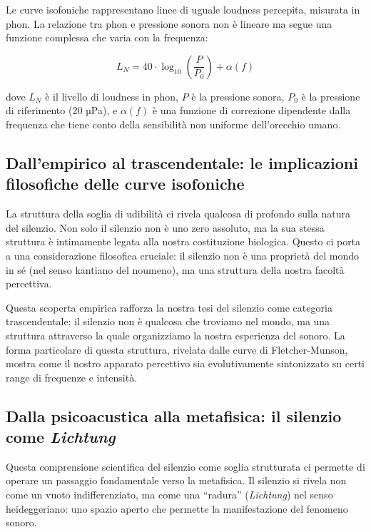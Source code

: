 \documentclass[a4paper,11pt]{article}
\begin{document}
Le curve isofoniche rappresentano linee di uguale loudness percepita,
misurata in phon. La relazione tra phon e pressione sonora non è lineare
ma segue una funzione complessa che varia con la frequenza:

\[L_N = 40 \cdot \log_{10}\left(\frac{P}{P_0}\right) + \alpha(f)\]

dove \(L_N\) è il livello di loudness in phon, \(P\) è la pressione
sonora, \(P_0\) è la pressione di riferimento (20 µPa), e \(\alpha(f)\)
è una funzione di correzione dipendente dalla frequenza che tiene conto
della sensibilità non uniforme dell'orecchio umano.

\subsection{Dall'empirico al trascendentale: le implicazioni filosofiche
delle curve
isofoniche}\label{dallempirico-al-trascendentale-le-implicazioni-filosofiche-delle-curve-isofoniche}

La struttura della soglia di udibilità ci rivela qualcosa di profondo
sulla natura del silenzio. Non solo il silenzio non è uno zero assoluto,
ma la sua stessa struttura è intimamente legata alla nostra costituzione
biologica. Questo ci porta a una considerazione filosofica cruciale: il
silenzio non è una proprietà del mondo in sé (nel senso kantiano del
noumeno), ma una struttura della nostra facoltà percettiva.

Questa scoperta empirica rafforza la nostra tesi del silenzio come
categoria trascendentale: il silenzio non è qualcosa che troviamo nel
mondo, ma una struttura attraverso la quale organizziamo la nostra
esperienza del sonoro. La forma particolare di questa struttura,
rivelata dalle curve di Fletcher-Munson, mostra come il nostro apparato
percettivo sia evolutivamente sintonizzato su certi range di frequenze e
intensità.

\subsection{\texorpdfstring{Dalla psicoacustica alla metafisica: il
silenzio come
\emph{Lichtung}}{Dalla psicoacustica alla metafisica: il silenzio come Lichtung}}\label{dalla-psicoacustica-alla-metafisica-il-silenzio-come-lichtung}

Questa comprensione scientifica del silenzio come soglia strutturata ci
permette di operare un passaggio fondamentale verso la metafisica. Il
silenzio si rivela non come un vuoto indifferenziato, ma come una
``radura'' (\emph{Lichtung}) nel senso heideggeriano: uno spazio aperto
che permette la manifestazione del fenomeno sonoro.
\end{document}
